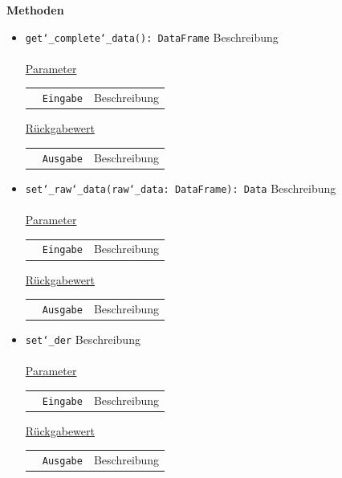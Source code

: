 \documentclass{article}
\begin{document}
\textbf{{Methoden}}
\begin{itemize}
\item \texttt{get\char`_complete\char`_data(): DataFrame} \newline Beschreibung
\\\\
\underline{{Parameter}}

\begin{tabular}{lll}
 & \texttt{Eingabe} & Beschreibung \\
\end{tabular}

\underline{{Rückgabewert}}

\begin{tabular}{lll}
 & \texttt{Ausgabe} & Beschreibung \\
\end{tabular}

\item \texttt{set\char`_raw\char`_data(raw\char`_data: DataFrame): Data} \newline Beschreibung
\\\\
\underline{{Parameter}}

\begin{tabular}{lll}
 & \texttt{Eingabe} & Beschreibung \\
\end{tabular}

\underline{{Rückgabewert}}

\begin{tabular}{lll}
 & \texttt{Ausgabe} & Beschreibung \\
\end{tabular}

\item \texttt{set\char`_der} \newline Beschreibung
\\\\
\underline{{Parameter}}

\begin{tabular}{lll}
 & \texttt{Eingabe} & Beschreibung \\
\end{tabular}

\underline{{Rückgabewert}}

\begin{tabular}{lll}
 & \texttt{Ausgabe} & Beschreibung \\
\end{tabular}
\end{itemize}
\end{document}
